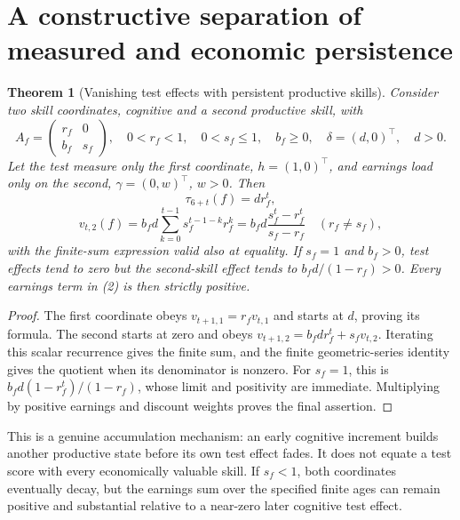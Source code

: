 \documentclass[11pt,a4paper]{article}
\newtheorem{theorem}{Theorem}[section]
\theoremstyle{remark}
\begin{document}
\section{A constructive separation of measured and economic persistence}
\begin{theorem}[Vanishing test effects with persistent productive skills]
Consider two skill coordinates, cognitive and a second productive skill, with
\[
 A_f=\begin{pmatrix}r_f&0\\b_f&s_f\end{pmatrix},
 \quad0<r_f<1,\quad0<s_f\le1,\quad b_f\ge0,
 \quad\delta=(d,0)^\top,\quad d>0.
\]
Let the test measure only the first coordinate, $h=(1,0)^\top$, and earnings load only on the second, $\gamma=(0,w)^\top$, $w>0$. Then
\[
 \tau_{6+t}(f)=d r_f^t,
\]
\[
 v_{t,2}(f)=b_fd\sum_{k=0}^{t-1}s_f^{t-1-k}r_f^k
 =b_fd\frac{s_f^t-r_f^t}{s_f-r_f}\quad(r_f\ne s_f), \tag{3}
\]
with the finite-sum expression valid also at equality. If $s_f=1$ and $b_f>0$, test effects tend to zero but the second-skill effect tends to $b_fd/(1-r_f)>0$. Every earnings term in (2) is then strictly positive.
\end{theorem}
\begin{proof}
The first coordinate obeys $v_{t+1,1}=r_fv_{t,1}$ and starts at $d$, proving its formula. The second starts at zero and obeys $v_{t+1,2}=b_fdr_f^t+s_fv_{t,2}$. Iterating this scalar recurrence gives the finite sum, and the finite geometric-series identity gives the quotient when its denominator is nonzero. For $s_f=1$, this is $b_fd(1-r_f^t)/(1-r_f)$, whose limit and positivity are immediate. Multiplying by positive earnings and discount weights proves the final assertion.
\end{proof}
This is a genuine accumulation mechanism: an early cognitive increment builds another productive state before its own test effect fades. It does not equate a test score with every economically valuable skill. If $s_f<1$, both coordinates eventually decay, but the earnings sum over the specified finite ages can remain positive and substantial relative to a near-zero later cognitive test effect.
\end{document}
